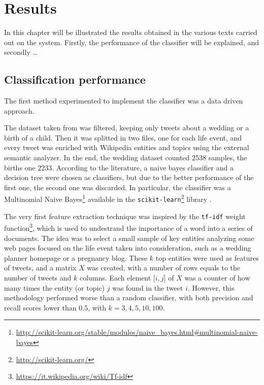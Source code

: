 \chapter{Results}
\label{cha:results}
In this chapter will be illustrated the results obtained in the various texts carried out on the system. Firstly, the performance of the classifier will be explained, and secondly \dots

\section{Classification performance}
The first method experimented to implement the classifier was a data driven approach. 

The dataset taken from \cite{dickinson2015identifying} was filtered, keeping only tweets about a wedding or a birth of a child. Then it was splitted in two files, one for each life event, and every tweet was enriched with Wikipedia entities and topics using the external semantic analyzer. In the end, the wedding dataset counted $2538$ samples, the births one $2233$. According to the literature, a naive bayes classifier and a decision tree were chosen as classifiers, but due to the better performance of the first one, the second one was discarded. In particular, the classifier was a Multinomial Naive Bayes\footnote{\url{http://scikit-learn.org/stable/modules/naive_bayes.html#multinomial-naive-bayes}} available in the \texttt{scikit-learn}\footnote{\url{http://scikit-learn.org/}} library \cite{scikit-learn}.

The very first feature extraction technique was inspired by the \texttt{tf-idf} weight function\footnote{\url{https://it.wikipedia.org/wiki/Tf-idf}}, which is used to undestrand the importance of a word into a series of documents. The idea was to select a small sample of key entities analyzing some web pages focused on the life event taken into consideration, such as a wedding planner homepage or a pregnancy blog. These $k$ top entities were used as features of tweets, and a matrix $X$ was created, with a number of rows equals to the number of tweets and $k$ columns. Each element [$i,j$] of $X$ was a counter of how many times the entity (or topic) $j$ was found in the tweet $i$. However, this methodology performed worse than a random classifier, with both precision and recall scores lower than $0.5$, with $k = 3, 4, 5, 10, 100$.


